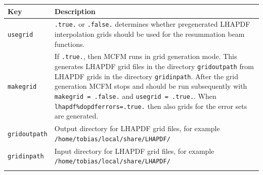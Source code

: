 \documentclass[
  11pt]{scrartcl}
\begin{document}
\begin{longtable}[]{@{}ll@{}}
\toprule
\begin{minipage}[b]{0.24\columnwidth}\raggedright
Key\strut
\end{minipage} & \begin{minipage}[b]{0.71\columnwidth}\raggedright
Description\strut
\end{minipage}\tabularnewline
\midrule
\endhead
\begin{minipage}[t]{0.24\columnwidth}\raggedright
\texttt{usegrid}\strut
\end{minipage} & \begin{minipage}[t]{0.71\columnwidth}\raggedright
\texttt{.true.} or \texttt{.false.} determines whether pregenerated
LHAPDF interpolation grids should be used for the resummation beam
functions.\strut
\end{minipage}\tabularnewline
\begin{minipage}[t]{0.24\columnwidth}\raggedright
\texttt{makegrid}\strut
\end{minipage} & \begin{minipage}[t]{0.71\columnwidth}\raggedright
If \texttt{.true.}, then MCFM runs in grid generation mode. This
generates LHAPDF grid files in the directory \texttt{gridoutpath} from
LHAPDF grids in the directory \texttt{gridinpath}. After the grid
generation MCFM stops and should be run subsequently with
\texttt{makegrid = .false.} and \texttt{usegrid = .true.}. When
\texttt{lhapdf\%dopdferrors=.true.} then also grids for the error sets
are generated.\strut
\end{minipage}\tabularnewline
\begin{minipage}[t]{0.24\columnwidth}\raggedright
\texttt{gridoutpath}\strut
\end{minipage} & \begin{minipage}[t]{0.71\columnwidth}\raggedright
Output directory for LHAPDF grid files, for example
\texttt{/home/tobias/local/share/LHAPDF/}\strut
\end{minipage}\tabularnewline
\begin{minipage}[t]{0.24\columnwidth}\raggedright
\texttt{gridinpath}\strut
\end{minipage} & \begin{minipage}[t]{0.71\columnwidth}\raggedright
Input directory for LHAPDF grid files, for example
\texttt{/home/tobias/local/share/LHAPDF/}\strut
\end{minipage}\tabularnewline
\begin{minipage}[t]{0.24\columnwidth}\raggedright

\end{minipage}
\end{longtable}
\end{document}
